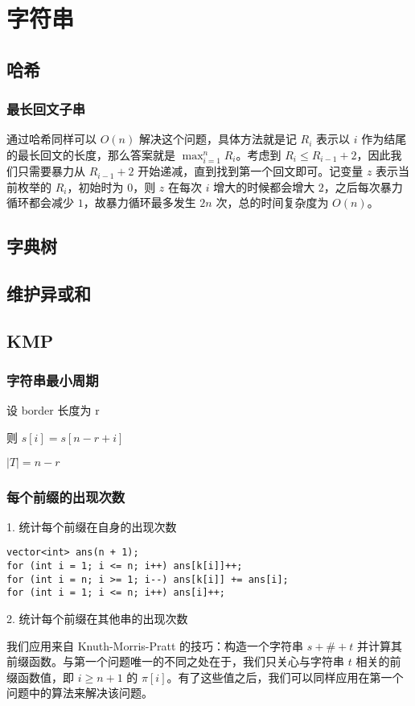 \documentclass[a4paper]{article}
\begin{document}
\section{字符串}
\subsection{哈希}
\subsubsection{最长回文子串}
通过哈希同样可以 $O(n)$ 解决这个问题，具体方法就是记 $R_i$ 表示以 $i$ 作为结尾的最长回文的长度，那么答案就是 $\max_{i=1}^nR_i$。考虑到 $R_i\leq R_{i-1}+2$，因此我们只需要暴力从 $R_{i-1}+2$ 开始递减，直到找到第一个回文即可。记变量 $z$ 表示当前枚举的 $R_i$，初始时为 $0$，则 $z$ 在每次 $i$ 增大的时候都会增大 $2$，之后每次暴力循环都会减少 $1$，故暴力循环最多发生 $2n$ 次，总的时间复杂度为 $O(n)$。
\subsection{字典树}
\subsection{维护异或和}

\subsection{KMP}

\subsubsection{字符串最小周期}

设 border 长度为 r

则 $s[i]=s[n-r+i]$

$|T|=n-r$
\subsubsection{每个前缀的出现次数}
1. 统计每个前缀在自身的出现次数
\begin{lstlisting}
vector<int> ans(n + 1);
for (int i = 1; i <= n; i++) ans[k[i]]++;
for (int i = n; i >= 1; i--) ans[k[i]] += ans[i];
for (int i = 1; i <= n; i++) ans[i]++;
\end{lstlisting}

2. 统计每个前缀在其他串的出现次数

我们应用来自 Knuth-Morris-Pratt 的技巧：构造一个字符串 $s + \# + t$ 并计算其前缀函数。与第一个问题唯一的不同之处在于，我们只关心与字符串 $t$ 相关的前缀函数值，即 $i \ge n + 1$ 的 $\pi[i]$。有了这些值之后，我们可以同样应用在第一个问题中的算法来解决该问题。
\end{document}
